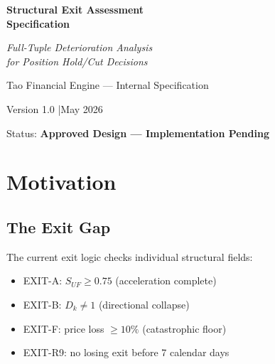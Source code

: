 \documentclass[11pt, a4paper]{article}
\begin{document}
\begin{titlepage}
  \centering
  \vspace*{2cm}
  {\Huge\bfseries Structural Exit Assessment\\[0.3em]
  Specification\par}
  \vspace{0.5cm}
  {\large\itshape Full-Tuple Deterioration Analysis\\
  for Position Hold/Cut Decisions\par}
  \vspace{2cm}
  {\large Tao Financial Engine --- Internal Specification\par}
  \vspace{0.5cm}
  {\normalsize Version 1.0 \quad|\quad May 2026\par}
  \vspace{0.5cm}
  {\normalsize Status: \textbf{Approved Design --- Implementation Pending}\par}
  \vspace{3cm}
  \begin{abstract}
    \noindent
    This specification defines the structural exit assessment for held positions
    in the Tao Financial Engine. When a position enters the intermediate loss zone
    (between 0\% and $-10$\%), the system assesses whether the structural energy
    that justified the entry has dissipated or is merely paused. The assessment
    reads the full coupled kernel tuple as a single geometric object, using three
    inputs: the horse (the stock's own structural history with this shape), the
    herd (structural peers assessed individually then read collectively), and
    match confidence (distance to closest precedent). The $-10$\% catastrophic
    floor remains unconditionally active regardless of assessment outcome.
  \end{abstract}
\end{titlepage}

\tableofcontents
\newpage

\section{Motivation}

\subsection{The Exit Gap}

The current exit logic checks individual structural fields:
\begin{itemize}
  \item EXIT-A: $S_{UF} \geq 0.75$ (acceleration complete)
  \item EXIT-B: $D_k \neq 1$ (directional collapse)
  \item EXIT-F: price loss $\geq 10\%$ (catastrophic floor)
  \item EXIT-R9: no losing exit before 7 calendar days
\end{itemize}
\end{document}
